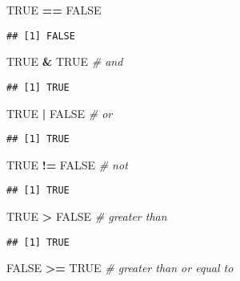 \documentclass[]{article}
\newenvironment{Shaded}{\begin{snugshade}}{\end{snugshade}}
\newcommand{\StringTok}[1]{\textcolor[rgb]{0.31,0.60,0.02}{#1}}
\newcommand{\CommentTok}[1]{\textcolor[rgb]{0.56,0.35,0.01}{\textit{#1}}}
\newcommand{\OtherTok}[1]{\textcolor[rgb]{0.56,0.35,0.01}{#1}}
\newcommand{\OperatorTok}[1]{\textcolor[rgb]{0.81,0.36,0.00}{\textbf{#1}}}
\begin{document}
\begin{Shaded}
\begin{Highlighting}[]
\OtherTok{TRUE} \OperatorTok{==}\StringTok{ }\OtherTok{FALSE}
\end{Highlighting}
\end{Shaded}

\begin{verbatim}
## [1] FALSE
\end{verbatim}

\begin{Shaded}
\begin{Highlighting}[]
\OtherTok{TRUE} \OperatorTok{&}\StringTok{ }\OtherTok{TRUE}   \CommentTok{# and }
\end{Highlighting}
\end{Shaded}

\begin{verbatim}
## [1] TRUE
\end{verbatim}

\begin{Shaded}
\begin{Highlighting}[]
\OtherTok{TRUE} \OperatorTok{|}\StringTok{ }\OtherTok{FALSE}  \CommentTok{# or}
\end{Highlighting}
\end{Shaded}

\begin{verbatim}
## [1] TRUE
\end{verbatim}

\begin{Shaded}
\begin{Highlighting}[]
\OtherTok{TRUE} \OperatorTok{!=}\StringTok{ }\OtherTok{FALSE}  \CommentTok{# not}
\end{Highlighting}
\end{Shaded}

\begin{verbatim}
## [1] TRUE
\end{verbatim}

\begin{Shaded}
\begin{Highlighting}[]
\OtherTok{TRUE} \OperatorTok{>}\StringTok{ }\OtherTok{FALSE} \CommentTok{# greater than}
\end{Highlighting}
\end{Shaded}

\begin{verbatim}
## [1] TRUE
\end{verbatim}

\begin{Shaded}
\begin{Highlighting}[]
\OtherTok{FALSE} \OperatorTok{>=}\StringTok{ }\OtherTok{TRUE} \CommentTok{# greater than or equal to}
\end{Highlighting}
\end{Shaded}
\end{document}
